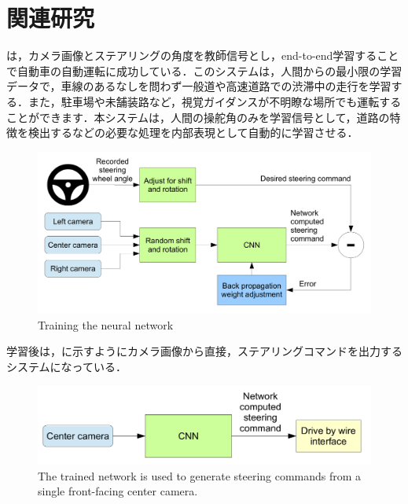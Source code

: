 
\section{関連研究}
は，カメラ画像とステアリングの角度を教師信号とし，end-to-end学習することで自動車の自動運転に成功している．このシステムは，人間からの最小限の学習データで，車線のあるなしを問わず一般道や高速道路での渋滞中の走行を学習する．また，駐車場や未舗装路など，視覚ガイダンスが不明瞭な場所でも運転することができます．本システムは，人間の操舵角のみを学習信号として，道路の特徴を検出するなどの必要な処理を内部表現として自動的に学習させる．
     \begin{figure}[h]
          \centering
          \includegraphics[keepaspectratio, scale=0.16] {images/bojarski_train.png}
          \caption{Training the neural network \cite{bojarski}}
          \label{Fig:bojarski_train}
     \end{figure}

学習後は，に示すようにカメラ画像から直接，ステアリングコマンドを出力するシステムになっている．

     \begin{figure}[h]
          \centering
          \includegraphics[keepaspectratio, scale=0.20] {images/bojarski_test.png}
          \captionsetup{justification=raggedright} %
          \caption{The trained network is used to generate steering commands from a single front-facing center camera. \cite{bojarski}}
          \label{Fig:bojarski_test}
     \end{figure}

